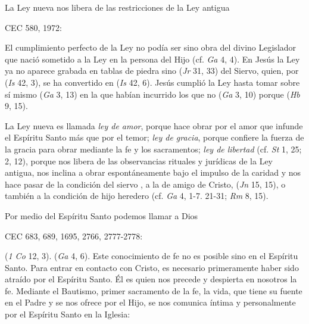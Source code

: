 	La Ley nueva nos libera de las restricciones de la Ley antigua
	
	CEC 580, 1972:
	
	 El cumplimiento perfecto de la Ley no podía ser sino obra del divino Legislador que nació sometido a la Ley en la persona del Hijo (cf. \emph{Ga} 4, 4). En Jesús la Ley ya no aparece grabada en tablas de piedra sino  (\emph{Jr} 31, 33) del Siervo, quien, por  (\emph{Is} 42, 3), se ha convertido en  (\emph{Is} 42, 6). Jesús cumplió la Ley hasta tomar sobre sí mismo  (\emph{Ga} 3, 13) en la que habían incurrido los que no  (\emph{Ga} 3, 10) porque  (\emph{Hb} 9, 15).
	
	 La Ley nueva es llamada \emph{ley de amor}, porque hace obrar por el amor que infunde el Espíritu Santo más que por el temor; \emph{ley de gracia}, porque confiere la fuerza de la gracia para obrar mediante la fe y los sacramentos; \emph{ley de libertad} (cf. \emph{St} 1, 25; 2, 12), porque nos libera de las observancias rituales y jurídicas de la Ley antigua, nos inclina a obrar espontáneamente bajo el impulso de la caridad y nos hace pasar de la condición del siervo , a la de amigo de Cristo,  (\emph{Jn} 15, 15), o también a la condición de hijo heredero (cf. \emph{Ga} 4, 1-7. 21-31; \emph{Rm} 8, 15).
	
	Por medio del Espíritu Santo podemos llamar a Dios 
	
	CEC 683, 689, 1695, 2766, 2777-2778:
	
	  (\emph{1 Co} 12, 3).  (\emph{Ga} 4, 6). Este conocimiento de fe no es posible sino en el Espíritu Santo. Para entrar en contacto con Cristo, es necesario primeramente haber sido atraído por el Espíritu Santo. Él es quien nos precede y despierta en nosotros la fe. Mediante el Bautismo, primer sacramento de la fe, la vida, que tiene su fuente en el Padre y se nos ofrece por el Hijo, se nos comunica íntima y personalmente por el Espíritu Santo en la Iglesia:
	
